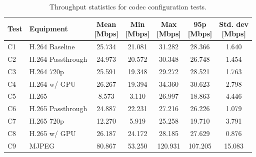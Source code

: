 \begin{table}[H]
    \centering
    \caption{Throughput statistics for codec configuration tests.}\label{tab:throughput_codec}
    \begin{tabular}{|l|l|c|c|c|c|c|}
    \hline
    \textbf{Test} & \textbf{Equipment} & \shortstack{\textbf{Mean}\\ \textbf{[Mbps]}} & \shortstack{\textbf{Min}\\ \textbf{[Mbps]}} & \shortstack{\textbf{Max}\\ \textbf{[Mbps]}} & \shortstack{\textbf{95p}\\ \textbf{[Mbps]}} & \shortstack{\textbf{Std. dev}\\ \textbf{[Mbps]}}\\
    \hline
    C1 & H.264 Baseline & 25.734 & 21.081 & 31.282 & 28.366 & 1.640\\
    \hline
    C2 & H.264 Passthrough & 24.973 & 20.572 & 30.348 & 26.748 & 1.454\\
    \hline
    C3 & H.264 720p & 25.591 & 19.348 & 29.272 & 28.521 & 1.763\\
    \hline
    C4 & H.264 w/ GPU & 26.267 & 19.394 & 34.360 & 30.623 & 2.798\\
    \hline
    C5 & H.265 & 8.573 & 3.110 & 26.997 & 18.863 & 4.446\\
    \hline
    C6 & H.265 Passthrough & 24.887 & 22.231 & 27.216 & 26.226 & 1.079\\
    \hline
    C7 & H.265 720p & 12.270 & 5.919 & 25.258 & 19.710 & 3.791\\
    \hline
    C8 & H.265 w/ GPU & 26.187 & 24.172 & 28.185 & 27.629 & 0.876\\
    \hline
    C9 & MJPEG & 80.867 & 53.250 & 120.931 & 107.205 & 15.083\\
    \hline
    \end{tabular}
\end{table}
